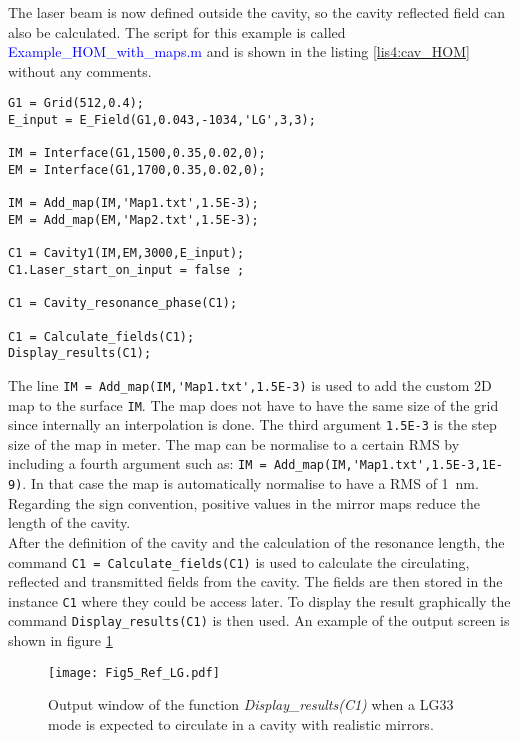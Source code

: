 The laser beam is now defined outside the cavity, so the cavity reflected field can also be calculated. The script for this example is called \textcolor{blue}{Example\_HOM\_with\_maps.m} and is shown in the listing \ref{lis4:cav_HOM} without any comments.\\

\begin{lstlisting}[float=htp,caption=Example of OSCAR script to calculate the reflected field from a cavity with maps \label{lis4:cav_HOM},frame=lines]
G1 = Grid(512,0.4);
E_input = E_Field(G1,0.043,-1034,'LG',3,3);

IM = Interface(G1,1500,0.35,0.02,0);
EM = Interface(G1,1700,0.35,0.02,0);

IM = Add_map(IM,'Map1.txt',1.5E-3);
EM = Add_map(EM,'Map2.txt',1.5E-3);

C1 = Cavity1(IM,EM,3000,E_input);
C1.Laser_start_on_input = false ;

C1 = Cavity_resonance_phase(C1);

C1 = Calculate_fields(C1);
Display_results(C1);
\end{lstlisting}

The line \verb|IM = Add_map(IM,'Map1.txt',1.5E-3)| is used to add the custom 2D map to the surface \verb|IM|. The map does not have to have the same size of the grid since internally an interpolation is done. The third argument \verb|1.5E-3| is the step size of the map in meter. The map can be normalise to a certain RMS by including a fourth argument such as: \verb|IM = Add_map(IM,'Map1.txt',1.5E-3,1E-9)|. In that case the map is automatically normalise to have a RMS of 1~nm.
Regarding the sign convention, positive values in the mirror maps reduce the length of the cavity.\\

After the definition of the cavity and the calculation of the resonance length, the command \verb|C1 = Calculate_fields(C1)| is used to calculate the circulating, reflected and transmitted fields from the cavity. The fields are then stored in the instance \verb|C1| where they could be access later. To display the result graphically the command \verb|Display_results(C1)| is then used. An example of the output screen is shown in figure \ref{fig5:LG33}

\begin{figure}
\begin{center}
\texttt{[image: Fig5\_Ref\_LG.pdf]}
\end{center}
\caption{\label{fig5:LG33} Output window of the function \emph{Display\_results(C1)} when a LG33 mode is expected to circulate in a cavity with realistic mirrors.}
\end{figure}

